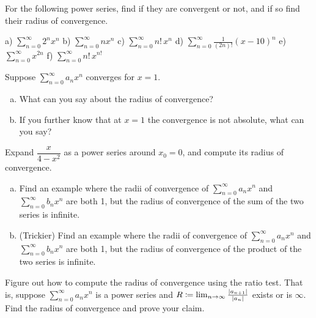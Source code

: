 \begin{exercise}
For the following power series, find if they are convergent or not, and
if so find their radius of convergence.

\medskip

\noindent
a)
$\displaystyle \sum_{n=0}^\infty 2^n x^n$
\qquad
b) $\displaystyle \sum_{n=0}^\infty n x^n$
\qquad 
c) 
$\displaystyle \sum_{n=0}^\infty n! \, x^n$
\qquad
d) $\displaystyle \sum_{n=0}^\infty \frac{1}{(2n)!} {(x-10)}^n$
\qquad
e) $\displaystyle \sum_{n=0}^\infty x^{2n}$
\qquad
f) $\displaystyle \sum_{n=0}^\infty n! \, x^{n!}$
\end{exercise}

\begin{exercise}
Suppose $\sum_{n=0}^\infty a_n x^n$ converges for $x=1$.
\begin{enumerate}[a)]
\item
What can you say about the radius of convergence?
\item
If you further know that at $x=1$ the convergence is not absolute,
what can you say?
\end{enumerate}
\end{exercise}

\begin{exercise}
Expand
$\dfrac{x}{4-x^2}$ as a power series around $x_0 = 0$,
and compute its radius of convergence.
\end{exercise}

\begin{exercise}
\leavevmode
\begin{enumerate}[a)]
\item
Find an example where the radii of convergence of $\sum_{n=0}^\infty a_n x^n$ and
$\sum_{n=0}^\infty b_n x^n$ are both 1, but the radius of convergence of
the sum of the two series is infinite.
\item
(Trickier)
Find an example where the radii of convergence of $\sum_{n=0}^\infty a_n x^n$ and
$\sum_{n=0}^\infty b_n x^n$ are both 1, but the radius of convergence of
the product of the two series is infinite.
\end{enumerate}
\end{exercise}

\begin{exercise}
Figure out how to compute the radius of convergence using the ratio test.
That is, suppose $\sum_{n=0}^\infty a_n x^n$ is a power series and
$R \coloneqq \lim_{n\to\infty} \frac{\left\lvert {a_{n+1}} \right\rvert}{\left\lvert {a_n} \right\rvert}$ exists or is $\infty$.
Find the radius of convergence and prove your claim.
\end{exercise}

